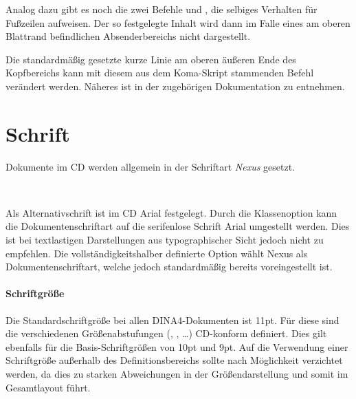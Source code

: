 Analog dazu gibt es noch die zwei Befehle 
und , die selbiges Verhalten für Fußzeilen aufweisen.
Der so festgelegte Inhalt wird dann im Falle eines am oberen Blattrand
befindlichen Absenderbereichs nicht dargestellt.

\begin{Declaration}
\end{Declaration}


Die standardmäßig gesetzte kurze Linie am oberen äußeren Ende des
Kopfbereichs kann mit diesem aus dem Koma-Skript stammenden Befehl verändert
werden. Näheres ist in der zugehörigen Dokumentation zu
entnehmen\cite{koma-skript}.


\section{Schrift}

Dokumente im \acs{CD} werden allgemein in der Schriftart \emph{Nexus}
gesetzt.

\begin{Declaration}
  \\
\end{Declaration}

Als Alternativschrift ist im \acs{CD} Arial festgelegt. Durch die Klassenoption
 kann die Dokumentenschriftart auf die serifenlose Schrift
Arial umgestellt werden. Dies ist bei textlastigen Darstellungen aus
typographischer Sicht jedoch nicht zu empfehlen.
Die vollständigkeitshalber definierte Option  wählt Nexus als 
Dokumentenschriftart, welche jedoch standardmäßig bereits voreingestellt ist.


\paragraph{Schriftgröße}

Die Standardschriftgröße bei allen DINA4-Dokumenten ist 11pt.
Für diese sind die verschiedenen Größenabstufungen
(, , \ldots) \acs{CD}-konform definiert.
Dies gilt ebenfalls für die Basis-Schriftgrößen von 10pt und 9pt.
Auf die Verwendung einer Schriftgröße außerhalb des Definitionsbereichs sollte
nach Möglichkeit verzichtet werden, da dies zu starken Abweichungen in der
Größendarstellung und somit im Gesamtlayout führt.


